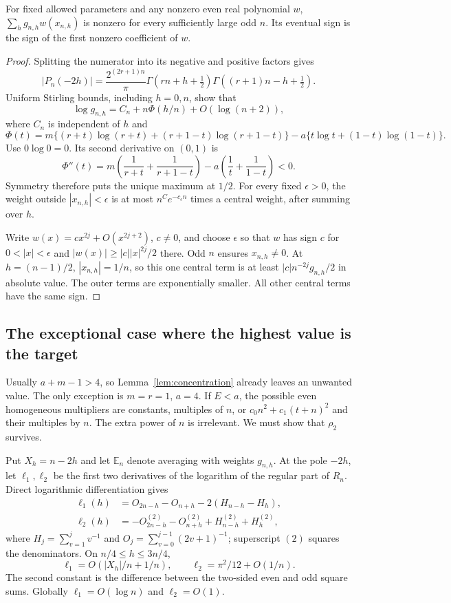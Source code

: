 \begin{lemma}\label{lem:concentration}
For fixed allowed parameters and any nonzero even real polynomial $w$,
$\sum_hg_{n,h}w(x_{n,h})$ is nonzero for every sufficiently large odd $n$.
Its eventual sign is the sign of the first nonzero coefficient of $w$.
\end{lemma}
\begin{proof}
Splitting the numerator into its negative and positive factors gives
\[
 |P_n(-2h)|=\frac{2^{(2r+1)n}}{\pi}
 \Gamma(rn+h+\tfrac12)\Gamma((r+1)n-h+\tfrac12).
\]
Uniform Stirling bounds, including $h=0,n$, show that
\[
 \log g_{n,h}=C_n+n\Phi(h/n)+O(\log(n+2)),
\]
where $C_n$ is independent of $h$ and
\[
 \Phi(t)=m\{(r+t)\log(r+t)+(r+1-t)\log(r+1-t)\}
            -a\{t\log t+(1-t)\log(1-t)\}.
\]
Use $0\log0=0$. Its second derivative on $(0,1)$ is
\[
 \Phi''(t)=m\left(\frac1{r+t}+\frac1{r+1-t}\right)
             -a\left(\frac1t+\frac1{1-t}\right)<0.
\]
Symmetry therefore puts the unique maximum at $1/2$. For every fixed
$\epsilon>0$, the weight outside $|x_{n,h}|<\epsilon$ is at most
$n^C e^{-c_\epsilon n}$ times a central weight, after summing over $h$.

Write $w(x)=c x^{2j}+O(x^{2j+2})$, $c\ne0$, and choose $\epsilon$
so that $w$ has sign $c$ for $0<|x|<\epsilon$ and
$|w(x)|\ge |c||x|^{2j}/2$ there. Odd $n$ ensures $x_{n,h}\ne0$.
At $h=(n-1)/2$, $|x_{n,h}|=1/n$, so this one central term is at
least $|c|n^{-2j}g_{n,h}/2$ in absolute value. The outer terms are
exponentially smaller. All other central terms have the same sign.
\end{proof}

\subsection{The exceptional case where the highest value is the target}
Usually $a+m-1>4$, so Lemma~\ref{lem:concentration} already leaves an
unwanted value. The only exception is $m=r=1$, $a=4$. If $E<a$,
the possible even homogeneous multipliers are constants, multiples of
$n$, or $c_0n^2+c_1(t+n)^2$ and their multiples by $n$.
The extra power of $n$ is irrelevant. We must show that $\rho_2$ survives.

Put $X_h=n-2h$ and let $\mathbb E_n$ denote averaging with weights
$g_{n,h}$. At the pole $-2h$, let $\ell_1,\ell_2$ be the first two
derivatives of the logarithm of the regular part of $R_n$. Direct
logarithmic differentiation gives
\begin{align*}
 \ell_1(h)&=O_{2n-h}-O_{n+h}-2(H_{n-h}-H_h),\\
 \ell_2(h)&=-O_{2n-h}^{(2)}-O_{n+h}^{(2)}
                         +H_{n-h}^{(2)}+H_h^{(2)},
\end{align*}
where $H_j=\sum_{v=1}^jv^{-1}$ and $O_j=\sum_{v=0}^{j-1}(2v+1)^{-1}$;
superscript $(2)$ squares the denominators. On $n/4\le h\le3n/4$,
\[
 \ell_1=O(|X_h|/n+1/n),\qquad \ell_2=\pi^2/12+O(1/n).
\]
The second constant is the difference between the two-sided even and
odd square sums. Globally $\ell_1=O(\log n)$ and $\ell_2=O(1)$.

